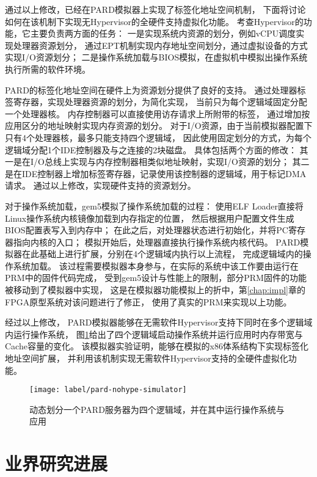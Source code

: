 通过以上修改，已经在PARD模拟器上实现了标签化地址空间机制，
下面将讨论如何在该机制下实现无Hypervisor的全硬件支持虚拟化功能。
考查Hypervisor的功能，它主要负责两方面的任务：
一是实现系统内资源的划分，例如vCPU调度实现处理器资源划分，
通过EPT机制实现内存地址空间划分，通过虚拟设备的方式实现I/O资源划分；
二是操作系统加载与BIOS模拟，在虚拟机中模拟出操作系统执行所需的软件环境。

PARD的标签化地址空间在硬件上为资源划分提供了良好的支持。
通过处理器标签寄存器，实现处理器资源的划分，为简化实现，
当前只为每个逻辑域固定分配一个处理器核。
内存控制器可以直接使用访存请求上所附带的标签，
通过增加按应用区分的地址映射实现内存资源的划分。
对于I/O资源，由于当前模拟器配置下只有4个处理器核，最多只能支持四个逻辑域，
因此使用固定划分的方式，为每个逻辑域分配1个IDE控制器及与之连接的2块磁盘。
具体包括两个方面的修改：
其一是在I/O总线上实现与内存控制器相类似地址映射，实现I/O资源的划分；
其二是在IDE控制器上增加标签寄存器，记录使用该控制器的逻辑域，用于标记DMA请求。
通过以上修改，实现硬件支持的资源划分。

对于操作系统加载，gem5模拟了操作系统加载的过程：
使用ELF Loader直接将Linux操作系统内核镜像加载到内存指定的位置，
然后根据用户配置文件生成BIOS配置表写入到内存中；
在此之后，对处理器状态进行初始化，并将PC寄存器指向内核的入口；
模拟开始后，处理器直接执行操作系统内核代码。
PARD模拟器在此基础上进行扩展，分别在4个逻辑域内执行以上流程，
完成逻辑域内的操作系统加载。
该过程需要模拟器本身参与，在实际的系统中该工作要由运行在PRM中的固件代码完成，
受到gem5设计与性能上的限制，部分PRM固件的功能被移动到了模拟器中实现，
这是在模拟器功能模拟上的折中，第\ref{chap:impl}章的FPGA原型系统对该问题进行了修正，
使用了真实的PRM来实现以上功能。

经过以上修改，
PARD模拟器能够在无需软件Hypervisor支持下同时在多个逻辑域内运行操作系统，
图\ref{fig:pard-nohype-simulator}给出了四个逻辑域启动操作系统并运行应用时内存带宽与Cache容量的变化。
该模拟器实验证明，能够在模拟的x86体系结构下实现标签化地址空间扩展，
并利用该机制实现无需软件Hypervisor支持的全硬件虚拟化功能。

\begin{figure}[tb]
  \centering
  \texttt{[image: label/pard-nohype-simulator]}
  \caption{动态划分一个PARD服务器为四个逻辑域，并在其中运行操作系统与应用}
  \label{fig:pard-nohype-simulator}
\end{figure}


\section{业界研究进展}
\label{chap:labeladdrspace:intel-rdt}

